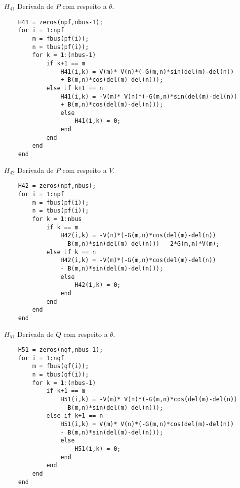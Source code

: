 $H_{41}$ Derivada de $P$ com respeito a $\theta$.
\begin{verbatim}    
    H41 = zeros(npf,nbus-1);
    for i = 1:npf
        m = fbus(pf(i));
        n = tbus(pf(i));
        for k = 1:(nbus-1)
            if k+1 == m
                H41(i,k) = V(m)* V(n)*(-G(m,n)*sin(del(m)-del(n)) 
                + B(m,n)*cos(del(m)-del(n)));
            else if k+1 == n
                H41(i,k) = -V(m)* V(n)*(-G(m,n)*sin(del(m)-del(n)) 
                + B(m,n)*cos(del(m)-del(n)));
                else
                    H41(i,k) = 0;
                end
            end
        end
    end
\end{verbatim}
$H_{42}$ Derivada de $P$ com respeito a $V$.
\begin{verbatim}    
    H42 = zeros(npf,nbus);
    for i = 1:npf
        m = fbus(pf(i));
        n = tbus(pf(i));
        for k = 1:nbus
            if k == m
                H42(i,k) = -V(n)*(-G(m,n)*cos(del(m)-del(n)) 
                - B(m,n)*sin(del(m)-del(n))) - 2*G(m,n)*V(m);
            else if k == n
                H42(i,k) = -V(m)*(-G(m,n)*cos(del(m)-del(n)) 
                - B(m,n)*sin(del(m)-del(n)));
                else
                    H42(i,k) = 0;
                end
            end
        end
    end
\end{verbatim}
$H_{51}$ Derivada de $Q$ com respeito a $\theta$.
\begin{verbatim}    
    H51 = zeros(nqf,nbus-1);
    for i = 1:nqf
        m = fbus(qf(i));
        n = tbus(qf(i));
        for k = 1:(nbus-1)
            if k+1 == m
                H51(i,k) = -V(m)* V(n)*(-G(m,n)*cos(del(m)-del(n)) 
                - B(m,n)*sin(del(m)-del(n)));
            else if k+1 == n
                H51(i,k) = V(m)* V(n)*(-G(m,n)*cos(del(m)-del(n)) 
                - B(m,n)*sin(del(m)-del(n)));
                else
                    H51(i,k) = 0;
                end
            end
        end
    end
\end{verbatim}
